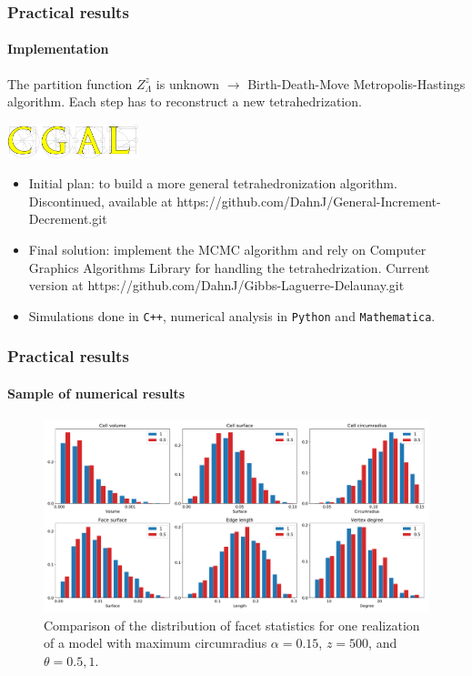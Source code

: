 \documentclass[c, 10pt]{beamer}
\begin{document}
\begin{frame}\frametitle{Practical results}
	\framesubtitle{Implementation}

	The partition function $Z^z_\Lambda$ is unknown $\rightarrow$ Birth-Death-Move Metropolis-Hastings algorithm. \newline
	Each step has to reconstruct a new tetrahedrization.
	
\begin{center}
\includegraphics[height = 1cm]{./FigureLayout/cgal.png}
\end{center}


\begin{itemize}
	\item Initial plan: to build a more general tetrahedronization algorithm. \newline
		{\scriptsize Discontinued, available at \alert{https://github.com/DahnJ/General-Increment-Decrement.git}}
	\item Final solution: implement the MCMC algorithm and rely on Computer Graphics Algorithms Library for handling the tetrahedrization. \newline
		{\footnotesize Current version at \alert{https://github.com/DahnJ/Gibbs-Laguerre-Delaunay.git}}
	\item Simulations done in \texttt{C++}, numerical analysis in \texttt{Python} and \texttt{Mathematica}.
\end{itemize}




\end{frame}






\begin{frame}\frametitle{Practical results}
	\framesubtitle{Sample of numerical results}
	
\begin{figure}
  \centering
  \includegraphics[width=1\textwidth]{./FigureLayout/facets_1_05.pdf}
  \caption{Comparison of the distribution of facet statistics for one realization of a model with maximum circumradius $\alpha=0.15$, $z=500$, and  $\theta = 0.5,1$.  }
  \label{fig:thetaeffect}
\end{figure}



\end{frame}
\end{document}

